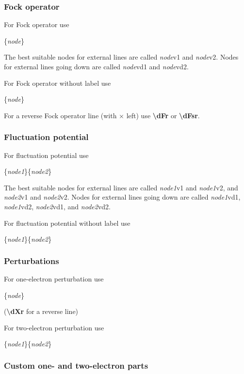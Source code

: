 \documentclass[a4paper]{article}
\newcommand{\myind}{\hspace{10pt}}
\begin{document}
\subsubsection{Fock operator}

For Fock operator use

\myind{\bf \textbackslash dF}\{{\it node}\}

The best suitable nodes for external lines are called {\it node}v1 and {\it node}v2. 
Nodes for external lines going down are called {\it node}vd1 and {\it node}vd2.

For Fock operator without label use

\myind{\bf \textbackslash dFs}\{{\it node}\}

For a reverse Fock operator line (with $\times$ left) use {\bf \textbackslash dFr} or {\bf \textbackslash dFsr}.

\subsubsection{Fluctuation potential}

For fluctuation potential use

\myind{\bf \textbackslash dW}\{{\it node1}\}\{{\it node2}\}

The best suitable nodes for external lines are called {\it node1}v1 and {\it node1}v2, 
and {\it node2}v1 and {\it node2}v2.
Nodes for external lines going down are called {\it node1}vd1, {\it node1}vd2, 
{\it node2}vd1, and {\it node2}vd2.

For fluctuation potential without label use

\myind{\bf \textbackslash dWs}\{{\it node1}\}\{{\it node2}\}

\subsubsection{Perturbations}

For one-electron perturbation use

\myind{\bf \textbackslash dX}\{{\it node}\}

({\bf \textbackslash dXr} for a reverse line)

For two-electron perturbation use

\myind{\bf \textbackslash dXtwo}\{{\it node1}\}\{{\it node2}\}


\subsubsection{Custom one- and two-electron parts}
\end{document}

